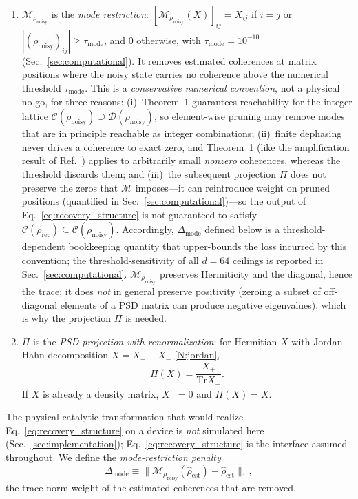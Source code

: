 \documentclass[12pt,a4paper]{article}
\newcommand{\CC}{\mathcal{C}}
\newcommand{\DD}{\mathcal{D}}
\newcommand{\tr}{\mathrm{Tr}}
\newcommand{\rhon}{\rho_\mathrm{noisy}}
\newcommand{\rhor}{\rho_\mathrm{rec}}
\newcommand{\rhoe}{\hat{\rho}_\mathrm{est}}
\begin{document}
\begin{enumerate}[label=(D\arabic*),leftmargin=3em]
\item \label{D:M} $\mathcal{M}_{\rhon}$ is the \emph{mode restriction}: $[\mathcal{M}_{\rhon}(X)]_{ij} = X_{ij}$ if $i = j$ or $|(\rhon)_{ij}| \geq \tau_\mathrm{mode}$, and $0$ otherwise, with $\tau_\mathrm{mode} = 10^{-10}$ (Sec.~\ref{sec:computational}).
It removes estimated coherences at matrix positions where the noisy state carries no coherence above the numerical threshold $\tau_\mathrm{mode}$. This is a \emph{conservative numerical convention}, not a physical no-go, for three reasons: (i)~Theorem~1 guarantees reachability for the integer lattice $\CC(\rhon) \supseteq \DD(\rhon)$, so element-wise pruning may remove modes that are in principle reachable as integer combinations; (ii)~finite dephasing never drives a coherence to exact zero, and Theorem~1 (like the amplification result of Ref.~\cite{Shiraishi2024}) applies to arbitrarily small \emph{nonzero} coherences, whereas the threshold discards them; and (iii)~the subsequent projection $\Pi$ does not preserve the zeros that $\mathcal{M}$ imposes---it can reintroduce weight on pruned positions (quantified in Sec.~\ref{sec:computational})---so the output of Eq.~\eqref{eq:recovery_structure} is not guaranteed to satisfy $\CC(\rhor) \subseteq \CC(\rhon)$. Accordingly, $\Delta_\mathrm{mode}$ defined below is a threshold-dependent bookkeeping quantity that upper-bounds the loss incurred by this convention; the threshold-sensitivity of all $d = 64$ ceilings is reported in Sec.~\ref{sec:computational}.
$\mathcal{M}_{\rhon}$ preserves Hermiticity and the diagonal, hence the trace; it does \emph{not} in general preserve positivity (zeroing a subset of off-diagonal elements of a PSD matrix can produce negative eigenvalues), which is why the projection $\Pi$ is needed.
\item \label{D:Pi} $\Pi$ is the \emph{PSD projection with renormalization}: for Hermitian $X$ with Jordan--Hahn decomposition $X = X_+ - X_-$ \ref{N:jordan},
\begin{equation}
\Pi(X) = \frac{X_+}{\tr X_+}.
\label{eq:psd_proj}
\end{equation}
If $X$ is already a density matrix, $X_- = 0$ and $\Pi(X) = X$.
\end{enumerate}
The physical catalytic transformation that would realize Eq.~\eqref{eq:recovery_structure} on a device is \emph{not} simulated here (Sec.~\ref{sec:implementation}); Eq.~\eqref{eq:recovery_structure} is the interface assumed throughout.
We define the \emph{mode-restriction penalty}
\begin{equation}
\Delta_{\mathrm{mode}} \equiv \bigl\|\mathcal{M}_{\rhon}(\rhoe) - \rhoe\bigr\|_1 ,
\label{eq:delta_mode}
\end{equation}
the trace-norm weight of the estimated coherences that are removed.
\end{document}

